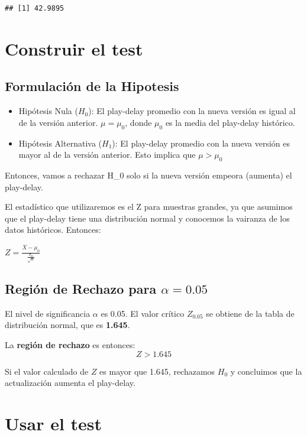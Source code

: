 \documentclass[
]{article}
\providecommand{\tightlist}{%
  \setlength{\itemsep}{0pt}\setlength{\parskip}{0pt}}
\begin{document}
\begin{verbatim}
## [1] 42.9895
\end{verbatim}

\section{Construir el test}\label{construir-el-test}

\subsection{Formulación de la
Hipotesis}\label{formulaciuxf3n-de-la-hipotesis}

\begin{itemize}
\tightlist
\item
  Hipótesis Nula (\(H_0\)): El play-delay promedio con la nueva versión
  es igual al de la versión anterior. \(μ = μ_0\), donde \(μ_0\) es la
  media del play-delay histórico.
\item
  Hipótesis Alternativa (\(H_1\)): El play-delay promedio con la nueva
  versión es mayor al de la versión anterior. Esto implica que
  \(μ > μ_0\)
\end{itemize}

Entonces, vamos a rechazar H\_0 solo si la nueva versión empeora
(aumenta) el play-delay.

El estadístico que utilizaremos es el Z para muestras grandes, ya que
asumimos que el play-delay tiene una distribución normal y conocemos la
vairanza de los datos históricos. Entonces:

\(Z = \frac{\bar{X} - \mu_0}{\frac{\sigma_0}{\sqrt{n}}}\)

\subsection{\texorpdfstring{Región de Rechazo para
\(\alpha = 0.05\)}{Región de Rechazo para \textbackslash alpha = 0.05}}\label{regiuxf3n-de-rechazo-para-alpha-0.05}

El nivel de significancia \(\alpha\) es 0.05. El valor crítico
\(Z_{0.05}\) se obtiene de la tabla de distribución normal, que es
\textbf{1.645}.

La \textbf{región de rechazo} es entonces: \[
Z > 1.645
\]

Si el valor calculado de \(Z\) es mayor que 1.645, rechazamos \(H_0\) y
concluimos que la actualización aumenta el play-delay.

\section{Usar el test}\label{usar-el-test}
\end{document}
